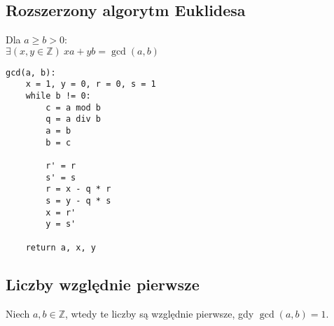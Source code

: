 \subsection*{Rozszerzony algorytm Euklidesa}
Dla $a \geq b > 0$: \\
$\exists (x, y \in \mathbb{Z}) \ xa + yb = \gcd(a, b)$
\begin{lstlisting}[style=code]
gcd(a, b):
    x = 1, y = 0, r = 0, s = 1
    while b != 0:
        c = a mod b
        q = a div b
        a = b
        b = c

        r' = r
        s' = s
        r = x - q * r
        s = y - q * s
        x = r'
        y = s'
    
    return a, x, y
\end{lstlisting}

\subsection*{Liczby względnie pierwsze}
Niech $a, b \in \mathbb{Z}$, wtedy te liczby są względnie pierwsze, gdy
$\gcd(a, b) = 1$.